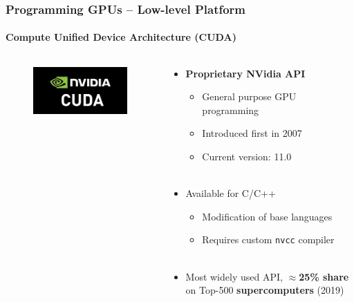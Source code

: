 \documentclass[aspectratio=1610]{beamer}
\begin{document}
\begin{frame}
    \frametitle{Programming GPUs -- Low-level Platform}
    \framesubtitle{Compute Unified Device Architecture (CUDA)}
    
    \begin{columns}
        \begin{column}{0.48\textwidth}
            \begin{figure}
                \centering
                \includegraphics[width=0.7\linewidth]{images/cuda.png}
                
            \end{figure}
        \end{column}
        \begin{column}{0.48\textwidth}
            \begin{itemize}
                \item \textbf{Proprietary NVidia API}
                \begin{itemize}
                    \item General purpose GPU programming
                    \item Introduced first in 2007
                    \item Current version: 11.0\\~
                \end{itemize}
                \item Available for C/C++
                \begin{itemize}
                    \item Modification of base languages
                    \item Requires custom \texttt{nvcc} compiler\\~
                \end{itemize}
                \item Most widely used API, $\approx$\textbf{25\% share} on Top-500 \textbf{supercomputers} (2019)
            \end{itemize}
        \end{column}
    \end{columns}
\end{frame}
\end{document}
